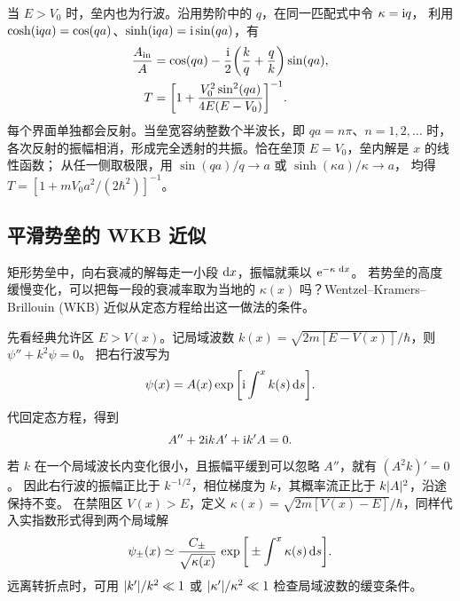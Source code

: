 当 $E > V_0$ 时，垒内也为行波。沿用势阶中的 $q$，在同一匹配式中令 $\kappa = \mathrm{i} q$，
利用 $\cosh(\mathrm{i} qa) = \cos(qa)$、$\sinh(\mathrm{i} qa) = \mathrm{i}\sin(qa)$，有
\begin{subequations}
    \begin{align}
        \frac{A_{\mathrm{in}}}{A} &= \cos(qa) - \frac{\mathrm{i}}{2}
            \bigg(\frac{k}{q} + \frac{q}{k}\bigg)\sin(qa),\\
        T &= \bigg[1 + \frac{V_0^2\sin^2(qa)}{4E(E - V_0)}\bigg]^{-1}.
    \end{align}
\end{subequations}
每个界面单独都会反射。当垒宽容纳整数个半波长，即 $qa = n\pi$、$n = 1,2,\ldots$ 时，
各次反射的振幅相消，形成完全透射的共振。恰在垒顶 $E = V_0$，垒内解是 $x$ 的线性函数；
从任一侧取极限，用 $\sin(qa)/q \to a$ 或 $\sinh(\kappa a)/\kappa \to a$，
均得 $T = [1 + mV_0a^2/(2\hbar^2)]^{-1}$。

\subsection{平滑势垒的 WKB 近似}
\label{ss:qm-wkb}

矩形势垒中，向右衰减的解每走一小段 $\mathop{}\!\mathrm{d} x$，振幅就乘以 $\mathop{}\!\mathrm{e}^{-\kappa\,\mathop{}\!\mathrm{d} x}$。
若势垒的高度缓慢变化，可以把每一段的衰减率取为当地的 $\kappa(x)$ 吗？Wentzel--Kramers--Brillouin (WKB) 近似从定态方程给出这一做法的条件\cite{mitwkb}。

先看经典允许区 $E > V(x)$。记局域波数 $k(x) = \sqrt{2m[E - V(x)]}/\hbar$，则 $\psi'' + k^2\psi = 0$。
把右行波写为
\[
    \psi(x) = A(x)\exp\bigg[\mathrm{i}\int^x k(s)\mathop{}\!\mathrm{d} s\bigg].
\]
代回定态方程，得到
\[
    A'' + 2\mathrm{i} k A' + \mathrm{i} k'A = 0 .
\]
若 $k$ 在一个局域波长内变化很小，且振幅平缓到可以忽略 $A''$，就有 $(A^2 k)' = 0$。
因此右行波的振幅正比于 $k^{-1/2}$，相位梯度为 $k$，其概率流正比于 $k\lvert A\rvert^2$，沿途保持不变。
在禁阻区 $V(x) > E$，定义 $\kappa(x) = \sqrt{2m[V(x) - E]}/\hbar$，同样代入实指数形式得到两个局域解
\begin{equation}\label{eq:qm-wkb-forbidden-waves}
    \psi_\pm(x) \simeq \frac{C_\pm}{\sqrt{\kappa(x)}}\,
        \exp\bigg[\pm\int^x\kappa(s)\mathop{}\!\mathrm{d} s\bigg].
\end{equation}
远离转折点时，可用 $\lvert k'\rvert/k^2 \ll 1$ 或 $\lvert\kappa'\rvert/\kappa^2 \ll 1$ 检查局域波数的缓变条件。

